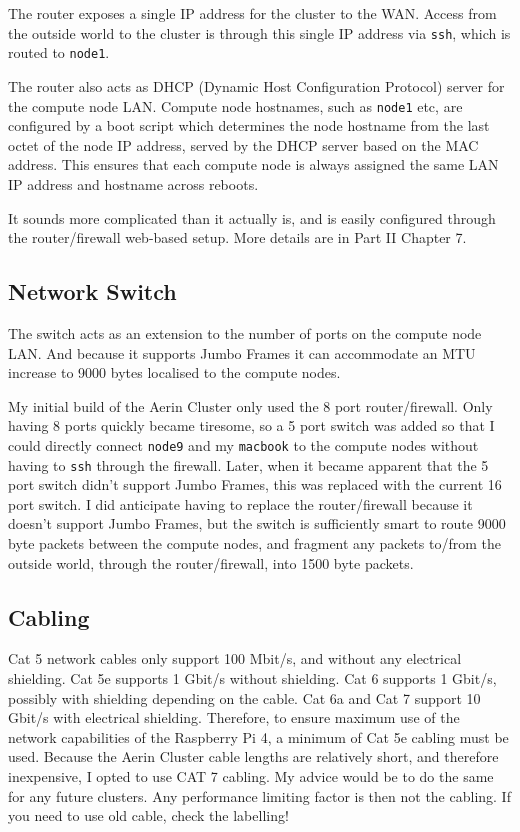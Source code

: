 \documentclass{report}
\begin{document}
The router exposes a single IP address for the cluster to the WAN. Access from the outside world to the cluster is through this single IP address via \verb|ssh|, which is routed to \verb|node1|.

The router also acts as DHCP (Dynamic Host Configuration Protocol) server for the compute node LAN. Compute node hostnames, such as \verb|node1| etc, are configured by a boot script which determines the node hostname from the last octet of the node IP address, served by the DHCP server based on the MAC address. This ensures that each compute node is always assigned the same LAN IP address and hostname across reboots.

It sounds more complicated than it actually is, and is easily configured through the router/firewall web-based setup. More details are in Part II Chapter 7.


%
%
\subsection{Network Switch}

The switch acts as an extension to the number of ports on the compute node LAN. And because it supports Jumbo Frames it can accommodate an MTU increase to 9000 bytes localised to the compute nodes.

My initial build of the Aerin Cluster only used the 8 port router/firewall. Only having 8 ports quickly became tiresome, so a 5 port switch was added so that I could directly connect \verb|node9| and my \verb|macbook| to the compute nodes without having to \verb|ssh| through the firewall. Later, when it became apparent that the 5 port switch didn't support Jumbo Frames, this was replaced with the current 16 port switch. I did anticipate having to replace the router/firewall because it doesn't support Jumbo Frames, but the switch is sufficiently smart to route 9000 byte packets between the compute nodes, and fragment any packets to/from the outside world, through the router/firewall, into 1500 byte packets.


%
%
\subsection{Cabling}
Cat 5 network cables only support 100 Mbit/s, and without any electrical shielding. Cat 5e supports 1 Gbit/s without shielding. Cat 6 supports 1 Gbit/s, possibly with shielding depending on the cable. Cat 6a and Cat 7 support 10 Gbit/s with electrical shielding. Therefore, to ensure maximum use of the network capabilities of the Raspberry Pi 4, a minimum of Cat 5e cabling must be used. Because the Aerin Cluster cable lengths are relatively short, and therefore inexpensive, I opted to use CAT 7 cabling. My advice would be to do the same for any future clusters. Any performance limiting factor is then not the cabling. If you need to use old cable, check the labelling!  
\end{document}
